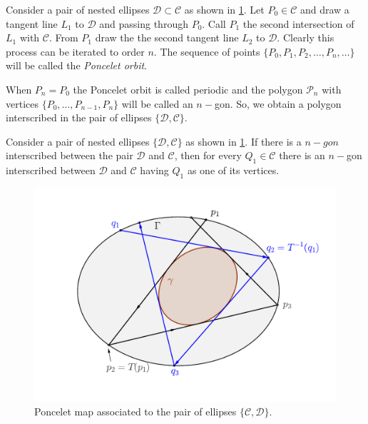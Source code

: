 Consider a pair of nested ellipses $\mathcal{D}\subset \mathcal{C}$ as shown in \cref{fig:poncelet}. Let $P_0\in \mathcal{C}$ and draw a tangent line $L_1$ to $\mathcal{D}$ and passing through $P_0$. Call $P_1$ the second intersection of $L_1$ with $\mathcal{C}.$
From $P_1$ draw the the second tangent line $L_2$ to $\mathcal{D}.$
Clearly this process can be iterated to order $n. $
The sequence of points $\{P_0,P_1,P_2,\ldots, P_n,\ldots\}$ will be called the {\em Poncelet orbit}.

When $P_n=P_0$ the Poncelet orbit is called periodic and the polygon $\mathcal{P}_n$ with vertices $\{P_0,\ldots, P_{n-1}, P_n\}$ will be called an $n-$gon. So, we obtain a polygon interscribed in the pair of ellipses $\{\mathcal{D},\mathcal{C}\}.$

\begin{theorem}  Consider a pair of nested ellipses $\{\mathcal{D},\mathcal{C}\}$ as shown in \cref{fig:poncelet}. If there is a $n-gon$ interscribed between the pair $\mathcal{D}$ and $\mathcal{C}$, then for every $Q_1\in \mathcal{C}$ there is an $n-$gon interscribed between $\mathcal{D}$ and $\mathcal{C}$ having $Q_1$ as one of its vertices.

\label{th:poncelet}
\end{theorem}


\begin{figure}
\begin{center}
\includegraphics[scale=0.6]{chap_02/pics/pics_chap2-030-poncelet-map.pdf}
\end{center}
\caption{Poncelet map associated to the pair of ellipses $\{\mathcal{C},\mathcal{D}\}.$}
\label{fig:poncelet}
\end{figure}

